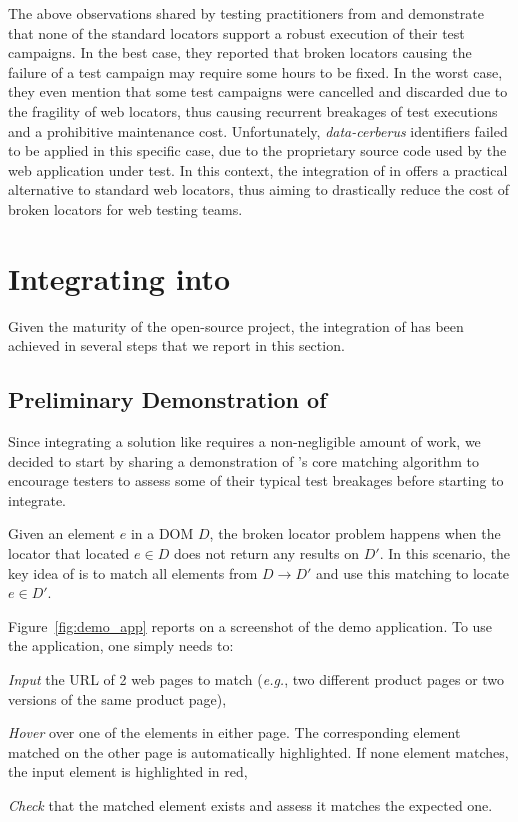 \documentclass[10pt,conference]{IEEEtran}
\begin{document}
The above observations shared by testing practitioners from \laredoute{} and \cerberus demonstrate that none of the standard locators support a robust execution of their test campaigns.
In the best case, they reported that broken locators causing the failure of a test campaign may require some hours to be fixed.
In the worst case, they even mention that some test campaigns were cancelled and discarded due to the fragility of web locators, thus causing recurrent breakages of test executions and a prohibitive maintenance cost.
Unfortunately, \textit{data-cerberus} identifiers failed to be applied in this specific case, due to the proprietary source code used by the web application under test.
In this context, the integration of \erratum{} in \cerberus{} offers a practical alternative to standard web locators, thus aiming to drastically reduce the cost of broken locators for web testing teams.

\section{Integrating \erratum into \cerberus}\label{sec:integration}
Given the maturity of the \cerberus open-source project, the integration of \erratum{} has been achieved in several steps that we report in this section.

\subsection{Preliminary Demonstration of \erratum}\label{sec:demo}
Since integrating a solution like \erratum requires a non-negligible amount of work, we decided to start by sharing a demonstration of \erratum's core matching algorithm to encourage testers to assess some of their typical test breakages before starting to integrate.

Given an element $e$ in a DOM $D$, the broken locator problem happens when the locator that located $e \in D$ does not return any results on $D'$.
In this scenario, the key idea of \erratum is to match all elements from $D \to D'$ and use this matching to locate $e \in D'$.

Figure~\ref{fig:demo_app} reports on a screenshot of the demo application.
To use the application, one simply needs to:
\begin{compactenum}[\em i)]
    \item \emph{Input} the URL of 2 web pages to match (\emph{e.g.}, two different product pages or two versions of the same product page),
    \item \emph{Hover} over one of the elements in either page. The corresponding element matched on the other page is automatically highlighted. If none element matches, the input element is highlighted in red,
    \item \emph{Check} that the matched element exists and assess it matches the expected one.
\end{compactenum}
\end{document}
